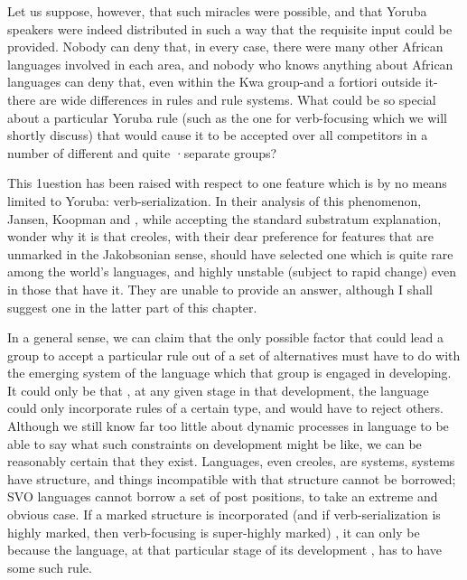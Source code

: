 Let us suppose, however, that such miracles were possible, and that Yoruba speakers were indeed distributed in such a way that the
requisite input could be provided. Nobody can deny that, in every case, there were many other African languages involved in each area, and nobody who knows anything about African languages can deny that, even within the Kwa group-and a fortiori outside it-there are wide differences in rules and rule systems. What could be so special about a particular Yoruba rule (such as the one for verb-focusing which we will shortly discuss) that would cause it to be accepted over all compe\-titors in a number of different and quite ·separate groups?

This 1uestion has been raised with respect to one feature which is by no means limited to Yoruba: verb-serialization. In their analysis of this phenomenon, Jansen, Koopman and \citet{Muysken1978}, while accepting the standard substratum explanation, wonder why it is that creoles, with their dear preference for features that are unmarked in the Jakobsonian sense, should have selected one which is quite rare among the world's languages, and highly unstable (subject to rapid change) even in those that have it. They are unable to provide an answer, although I shall suggest one in the latter part of this chapter.

In a general sense, we can claim that the only possible factor that could lead a group to accept a particular rule out of a set of alternatives must have to do with the emerging system of the language which that group is engaged in developing. It could only be that , at any given stage in that development, the language could only incorpor\-ate rules of a certain type, and would have to reject others. Although we still know far too little about dynamic processes in language to be able to say what such constraints on development might be like, we can be reasonably certain that they exist. Languages, even creoles, are systems, systems have structure, and things incompatible with that structure cannot be borrowed; SVO languages cannot borrow a set of post positions, to take an extreme and obvious case. If a marked struc\-ture is incorporated (and if verb-serialization is highly marked, then verb-focusing is super-highly marked) , it can only be because the language, at that particular stage of its development , has to have some such rule.

